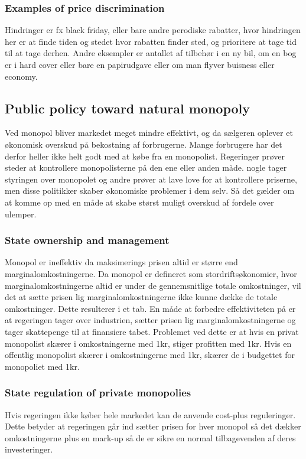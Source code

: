 \subsubsection{Examples of price discrimination}
Hindringer er fx black friday, eller bare andre perodiske rabatter, hvor hindringen her er at finde tiden og stedet hvor rabatten finder sted, og prioritere at tage tid til at tage derhen. Andre eksempler er antallet af tilbehør i en ny bil, om en bog er i hard cover eller bare en papirudgave eller om man flyver buisness eller economy. 

\subsection{Public policy toward natural monopoly}
Ved monopol bliver markedet meget mindre effektivt, og da sælgeren oplever et økonomisk overskud på bekostning af forbrugerne. Mange forbrugere har det derfor heller ikke helt godt med at købe fra en monopolist. Regeringer prøver steder at kontrollere monopolisterne på den ene eller anden måde. nogle tager styringen over monopolet og andre prøver at lave love for at kontrollere priserne, men disse politikker skaber økonomiske problemer i dem selv. Så det gælder om at komme op med en måde at skabe størst muligt overskud af fordele over ulemper. 

\subsubsection{State ownership and management}
Monopol er ineffektiv da maksimerings prisen altid er større end marginalomkostningerne. Da monopol er defineret som stordriftsøkonomier, hvor marginalomkostningerne altid er under de gennemsnitlige totale omkostninger, vil det at sætte prisen lig marginalomkostningerne ikke kunne dække de totale omkostninger. Dette resulterer i et tab. En måde at forbedre effektiviteten på er at regeringen tager over industrien, sætter prisen lig marginalomkostningerne og tager skattepenge til at finansiere tabet. Problemet ved dette er at hvis en privat monopolist skærer i omkostningerne med 1kr, stiger profitten med 1kr. Hvis en offentlig monopolist skærer i omkostningerne med 1kr, skærer de i budgettet for monopoliet med 1kr. 
\subsubsection{State regulation of private monopolies}
Hvis regeringen ikke køber hele markedet kan de anvende cost-plus reguleringer. Dette betyder at regeringen går ind sætter prisen for hver monopol så det dækker omkostningerne plus en mark-up så de er sikre en normal tilbagevenden af deres investeringer. 

